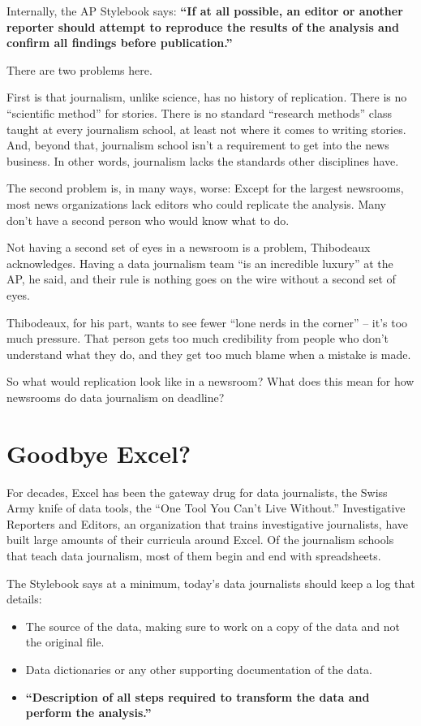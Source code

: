 \documentclass[
  letterpaper,
  DIV=11,
  numbers=noendperiod]{scrreprt}
\providecommand{\tightlist}{%
  \setlength{\itemsep}{0pt}\setlength{\parskip}{0pt}}\usepackage{longtable,booktabs,array}
\begin{document}
Internally, the AP Stylebook says: \textbf{``If at all possible, an
editor or another reporter should attempt to reproduce the results of
the analysis and confirm all findings before publication.''}

There are two problems here.

First is that journalism, unlike science, has no history of replication.
There is no ``scientific method'' for stories. There is no standard
``research methods'' class taught at every journalism school, at least
not where it comes to writing stories. And, beyond that, journalism
school isn't a requirement to get into the news business. In other
words, journalism lacks the standards other disciplines have.

The second problem is, in many ways, worse: Except for the largest
newsrooms, most news organizations lack editors who could replicate the
analysis. Many don't have a second person who would know what to do.

Not having a second set of eyes in a newsroom is a problem, Thibodeaux
acknowledges. Having a data journalism team ``is an incredible luxury''
at the AP, he said, and their rule is nothing goes on the wire without a
second set of eyes.

Thibodeaux, for his part, wants to see fewer ``lone nerds in the
corner'' -- it's too much pressure. That person gets too much
credibility from people who don't understand what they do, and they get
too much blame when a mistake is made.

So what would replication look like in a newsroom? What does this mean
for how newsrooms do data journalism on deadline?

\hypertarget{goodbye-excel}{%
\section{Goodbye Excel?}\label{goodbye-excel}}

For decades, Excel has been the gateway drug for data journalists, the
Swiss Army knife of data tools, the ``One Tool You Can't Live Without.''
Investigative Reporters and Editors, an organization that trains
investigative journalists, have built large amounts of their curricula
around Excel. Of the journalism schools that teach data journalism, most
of them begin and end with spreadsheets.

The Stylebook says at a minimum, today's data journalists should keep a
log that details:

\begin{itemize}
\tightlist
\item
  The source of the data, making sure to work on a copy of the data and
  not the original file.
\item
  Data dictionaries or any other supporting documentation of the data.
\item
  \textbf{``Description of all steps required to transform the data and
  perform the analysis.''}
\end{itemize}
\end{document}
